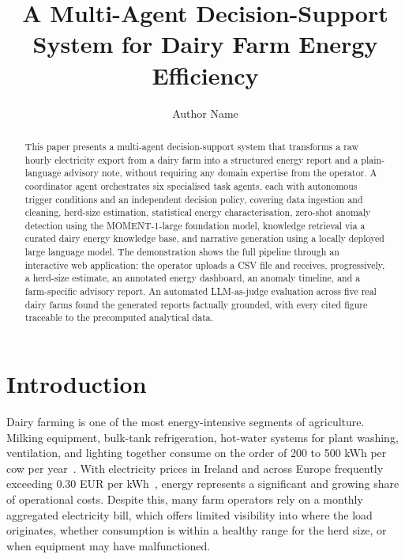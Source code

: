 \documentclass[runningheads]{llncs}
\begin{document}
\title{A Multi-Agent Decision-Support System for Dairy Farm Energy Efficiency}


\author{Author Name}



\maketitle

\begin{abstract}
This paper presents a multi-agent decision-support system that transforms a
raw hourly electricity export from a dairy farm into a structured energy
report and a plain-language advisory note, without requiring any domain
expertise from the operator. A coordinator agent orchestrates six specialised task agents, each
with autonomous trigger conditions and an independent decision policy, covering
data ingestion and cleaning, herd-size estimation, statistical energy
characterisation, zero-shot anomaly detection using the MOMENT-1-large
foundation model, knowledge retrieval via a curated dairy energy knowledge
base, and narrative generation using a locally deployed large language model.
The demonstration shows the full pipeline through an interactive web
application: the operator uploads a CSV file and receives, progressively, a
herd-size estimate, an annotated energy dashboard, an anomaly timeline, and a
farm-specific advisory report. An automated LLM-as-judge evaluation across
five real dairy farms found the generated reports factually grounded, with
every cited figure traceable to the precomputed analytical data.
\end{abstract}


\section{Introduction}
\label{sec:intro}

Dairy farming is one of the most energy-intensive segments of agriculture.
Milking equipment, bulk-tank refrigeration, hot-water systems for plant
washing, ventilation, and lighting together consume on the order of 200 to
500 kWh per cow per year~\cite{Upton2015}. With electricity prices in Ireland
and across Europe frequently exceeding 0.30 EUR per
kWh~\cite{Eurostat2024}, energy represents a significant and growing share
of operational costs. Despite this, many farm operators rely on a monthly
aggregated electricity bill, which offers limited visibility into where the
load originates, whether consumption is within a healthy range for the herd
size, or when equipment may have malfunctioned.
\end{document}
